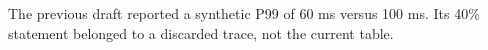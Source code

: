 The previous draft reported a synthetic P99 of 60 ms versus 100 ms.
Its 40\% statement belonged to a discarded trace, not the current table.

